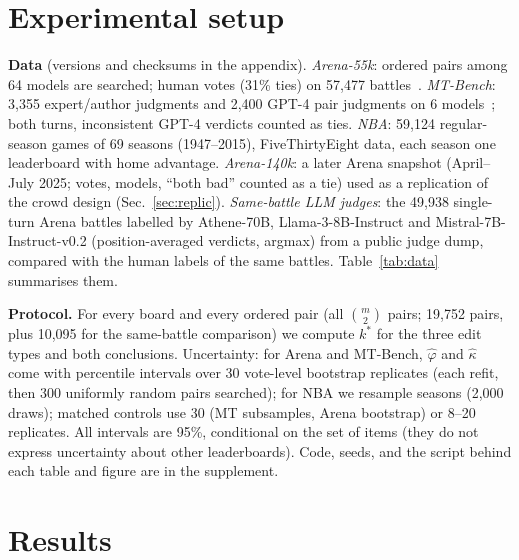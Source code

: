 \documentclass{article}
\newcommand{\kstar}{k^\ast}
\begin{document}
\section{Experimental setup}\label{sec:setup}
\textbf{Data} (versions and checksums in the appendix). \emph{Arena-55k}: \Nnpairsmain{} ordered pairs among 64 models are searched; human votes (31\% ties) on 57,477 battles~\citep{chiang2024arena}. \emph{MT-Bench}: 3,355 expert/author judgments and 2,400 GPT-4 pair judgments on 6 models~\citep{zheng2023judging}; both turns, inconsistent GPT-4 verdicts counted as ties. \emph{NBA}: 59,124 regular-season games of 69 seasons (1947--2015), FiveThirtyEight data, each season one leaderboard with home advantage. \emph{Arena-140k}: a later Arena snapshot (April--July 2025; \NarenaNewN{} votes, \NarenaNewM{} models, ``both bad'' counted as a tie) used as a replication of the crowd design (Sec.~\ref{sec:replic}). \emph{Same-battle LLM judges}: the 49,938 single-turn Arena battles labelled by Athene-70B, Llama-3-8B-Instruct and Mistral-7B-Instruct-v0.2 (position-averaged verdicts, argmax) from a public judge dump, compared with the human labels of the same battles. Table~\ref{tab:data} summarises them.

\textbf{Protocol.} For every board and every ordered pair (all $\binom{m}{2}$ pairs; 19,752 pairs, plus 10,095 for the same-battle comparison) we compute $\kstar$ for the three edit types and both conclusions. Uncertainty: for Arena and MT-Bench, $\hat\varphi$ and $\hat\kappa$ come with percentile intervals over 30 vote-level bootstrap replicates (each refit, then 300 uniformly random pairs searched); for NBA we resample seasons (2,000 draws); matched controls use 30 (MT subsamples, Arena bootstrap) or 8--20 replicates. All intervals are 95\%, conditional on the set of items (they do not express uncertainty about other leaderboards). Code, seeds, and the script behind each table and figure are in the supplement.

\begin{table}[t]
\caption{Leaderboards studied. $^\dagger$NBA: median over 69 seasons (votes \NnbaNmin--\NnbaNmax, teams \NnbaMmin--\NnbaMmax). ``pairs $z{>}1.96$'': share of all item pairs whose BT difference is significant; ``adj.'': same for rank-adjacent pairs. Most neighbouring entries of the large boards are statistical ties.}\label{tab:data}
\centering\small

\end{table}

\section{Results}
\end{document}
